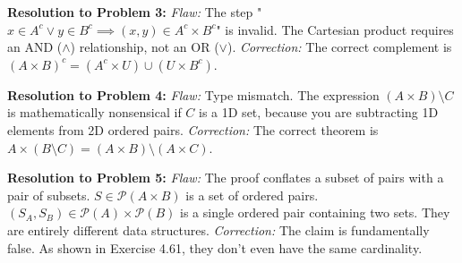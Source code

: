 \documentclass[11pt]{article}
\newcommand{\powerset}{\mathcal{P}}
\begin{document}
\textbf{Resolution to Problem 3:}
\textit{Flaw:} The step "$x \in A^c \lor y \in B^c \implies (x, y) \in A^c \times B^c$" is invalid. The Cartesian product requires an AND ($\land$) relationship, not an OR ($\lor$). 
\textit{Correction:} The correct complement is $(A \times B)^c = (A^c \times U) \cup (U \times B^c)$.

\textbf{Resolution to Problem 4:}
\textit{Flaw:} Type mismatch. The expression $(A \times B) \setminus C$ is mathematically nonsensical if $C$ is a 1D set, because you are subtracting 1D elements from 2D ordered pairs. 
\textit{Correction:} The correct theorem is $A \times (B \setminus C) = (A \times B) \setminus (A \times C)$.

\textbf{Resolution to Problem 5:}
\textit{Flaw:} The proof conflates a subset of pairs with a pair of subsets. $S \in \powerset(A \times B)$ is a set of ordered pairs. $(S_A, S_B) \in \powerset(A) \times \powerset(B)$ is a single ordered pair containing two sets. They are entirely different data structures.
\textit{Correction:} The claim is fundamentally false. As shown in Exercise 4.61, they don't even have the same cardinality.
\end{document}
